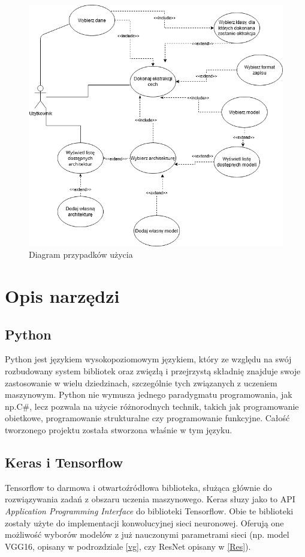 \documentclass[a4paper,twoside,12pt]{book}
\newcommand{\obcy}[1]{\emph{#1}}
\newcommand{\ang}[1]{{\selectlanguage{british}\obcy{#1}}}
\begin{document}
{{\begin{figure}[h!]
\centering
\includegraphics[scale=0.4]{usecase.png}
\caption{Diagram przypadków użycia}
\label{usecase}
\end{figure}

}
\section{Opis narzędzi}

\subsection{Python}
{Python jest językiem wysokopoziomowym językiem, który ze względu na swój rozbudowany system bibliotek oraz zwięzłą i przejrzystą składnię znajduje swoje zastosowanie w wielu dziedzinach, szczególnie tych związanych z uczeniem maszynowym. Python nie wymusza jednego paradygmatu programowania, jak np.C\#, lecz pozwala na użycie różnorodnych technik, takich jak programowanie obietkowe, programowanie strukturalne czy programowanie funkcyjne. Całość tworzonego projektu została stworzona właśnie w tym języku.}
\subsection{Keras i Tensorflow}
{Tensorflow to darmowa i otwartoźródłowa biblioteka, służąca głównie do rozwiązywania zadań z obszaru uczenia maszynowego. Keras słuzy jako to API \ang{Application Programming Interface} do biblioteki Tensorflow. Obie te biblioteki zostały użyte do implementacji konwolucyjnej sieci neuronowej. Oferują one możliwość wyborów modelów z już nauczonymi parametrami sieci (np. model VGG16, opisany w podrozdziale \ref{vg}, czy ResNet opisany w \ref{Res}).}
}
\end{document}
